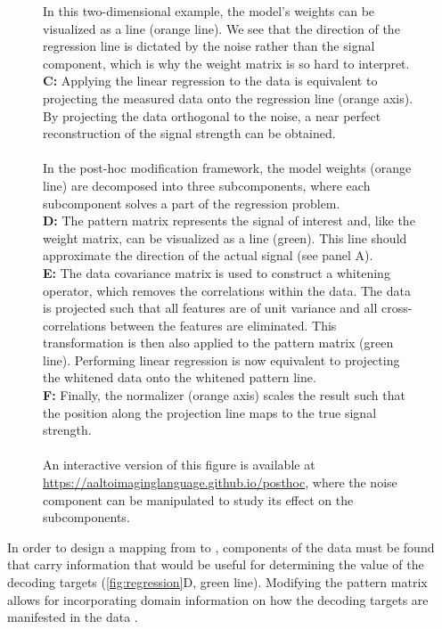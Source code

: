 \documentclass[a4paper]{vanvliet_paper}
\begin{document}
\begin{figure}[p]
{    In this two-dimensional example, the model's weights can be visualized as a line (orange line).
    We see that the direction of the regression line is dictated by the noise rather than the signal component, which is why the weight matrix is so hard to interpret.\\
    \textbf{C:} Applying the linear regression to the data is equivalent to projecting the measured data onto the regression line (orange axis).
    By projecting the data orthogonal to the noise, a near perfect reconstruction of the signal strength can be obtained.\\
    \\
    In the post-hoc modification framework, the model weights (orange line) are decomposed into three subcomponents, where each subcomponent solves a part of the regression problem.\\
    \textbf{D:} The pattern matrix represents the signal of interest and, like the weight matrix, can be visualized as a line (green). This line should approximate the direction of the actual signal (see panel A).\\
    \textbf{E:} The data covariance matrix is used to construct a whitening operator, which removes the correlations within the data. The data is projected such that all features are of unit variance and all cross-correlations between the features are eliminated. This transformation is then also applied to the pattern matrix (green line). Performing linear regression is now equivalent to projecting the whitened data onto the whitened pattern line.\\
    \textbf{F:} Finally, the normalizer (orange axis) scales the result such that the position along the projection line maps to the true signal strength.\\
    \\
    An interactive version of this figure is available at \url{https://aaltoimaginglanguage.github.io/posthoc}, where the noise component can be manipulated to study its effect on the subcomponents.
    }\label{fig:regression}
\end{figure}

In order to design a mapping from  to , components of the data must be found that carry information that would be useful for determining the value of the decoding targets (\autoref{fig:regression}D, green line).
Modifying the pattern matrix  allows for incorporating domain information on how the decoding targets  are manifested in the data .
\end{document}
